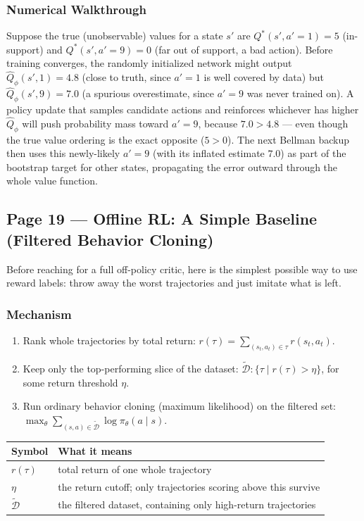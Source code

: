 \subsubsection*{Numerical Walkthrough}

Suppose the true (unobservable) values for a state $s'$ are $Q^*(s',a'=1)=5$ (in-support) and $Q^*(s',a'=9)=0$ (far out of support, a bad action). Before training converges, the randomly initialized network might output $\hat Q_\phi(s',1)=4.8$ (close to truth, since $a'=1$ is well covered by data) but $\hat Q_\phi(s',9)=7.0$ (a spurious overestimate, since $a'=9$ was never trained on). A policy update that samples candidate actions and reinforces whichever has higher $\hat Q_\phi$ will push probability mass toward $a'=9$, because $7.0 > 4.8$ --- even though the true value ordering is the exact opposite ($5 > 0$). The next Bellman backup then uses this newly-likely $a'=9$ (with its inflated estimate $7.0$) as part of the bootstrap target for other states, propagating the error outward through the whole value function.

\subsection*{Page 19 --- Offline RL: A Simple Baseline (Filtered Behavior Cloning)}

Before reaching for a full off-policy critic, here is the simplest possible way to use reward labels: throw away the worst trajectories and just imitate what is left.

\subsubsection*{Mechanism}

\begin{enumerate}
\item Rank whole trajectories by total return: $r(\tau) = \sum_{(s_t,a_t)\in\tau} r(s_t,a_t)$.
\item Keep only the top-performing slice of the dataset: $\widetilde{\mathcal{D}} : \{\tau \mid r(\tau) > \eta\}$, for some return threshold $\eta$.
\item Run ordinary behavior cloning (maximum likelihood) on the filtered set: $\max_\theta \sum_{(s,a)\in\widetilde{\mathcal{D}}} \log \pi_\theta(a\mid s)$.
\end{enumerate}

\begin{center}
\begin{tabular}{@{}ll@{}}
\toprule
Symbol & What it means \\
\midrule
$r(\tau)$ & total return of one whole trajectory \\
$\eta$ & the return cutoff; only trajectories scoring above this survive \\
$\widetilde{\mathcal{D}}$ & the filtered dataset, containing only high-return trajectories \\
\bottomrule
\end{tabular}
\end{center}

